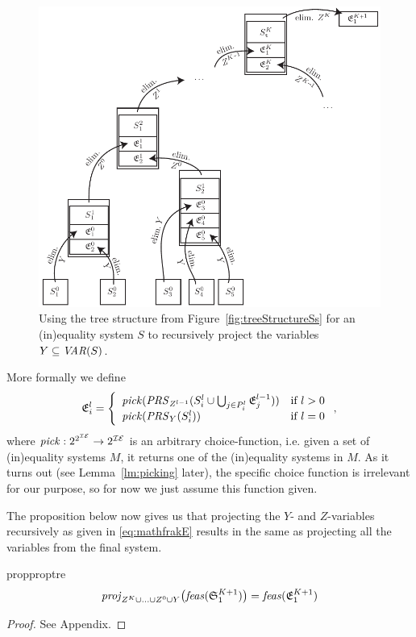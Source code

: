 \begin{figure}
	\centering
		\includegraphics{figures/recursiveProjectionEs.pdf}
	\caption{Using the tree structure from Figure~\ref{fig:treeStructureSs} for an (in)equality system $S$ to recursively project the variables $Y\subseteq \mathit{VAR}(S)$.}
	\label{fig:recursiveProjectionEs}
\end{figure}

\noindent More formally we define   
\begin{equation}\label{eq:mathfrakE}
\mathfrak{E}^l_i = \left\{\begin{array}{ll}
		\mathit{pick}(\mathit{PRS}_{Z^{l-1}}(S^l_i \cup\bigcup_{j\in P^l_i}\mathfrak{E}^{l-1}
		_j)) &\text{if }l>0\\
		\mathit{pick}(\mathit{PRS}_{Y}(S^l_i))&\text{if } l = 0
\end{array}\right.,
\end{equation}
where $\mathit{pick}: 2^{2^{\mathcal{IE}}}\to 2^{\mathcal{IE}}$ is an arbitrary choice-function, i.e. given a set of (in)equality systems $M$, it returns one of the (in)equality systems in $M$. As it turns out (see Lemma~\ref{lm:picking} later), the specific choice function is irrelevant for our purpose, so for now we just assume this function given.

The proposition below now gives us that projecting the $Y$- and $Z$-variables recursively as given in \eqref{eq:mathfrakE} results in the same as projecting all the variables from the final system. 
%
\begin{restatable}{prop}{proptre}\label{prop:3}
\[
\mathit{proj}_{Z^{K}\cup \ldots \cup Z^0\cup Y}\big(\mathit{feas}(\mathfrak{S}^{K+1}_1)\big) = \mathit{feas}(\mathfrak{E}^{K+1}_1)
\]
\end{restatable}
\begin{proof}
See Appendix.
\end{proof}
%

